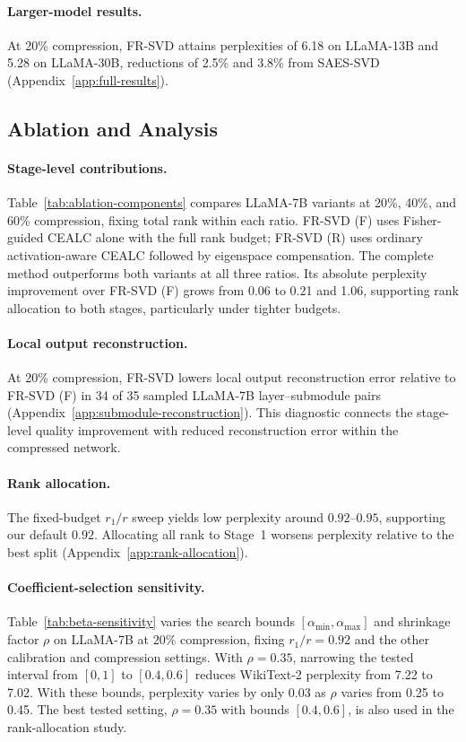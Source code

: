 \documentclass[11pt]{article}
\begin{document}
\paragraph{Larger-model results.}
At 20\% compression, FR-SVD attains perplexities of 6.18 on LLaMA-13B and 5.28 on LLaMA-30B, reductions of 2.5\% and 3.8\% from SAES-SVD (Appendix~\ref{app:full-results}).

\subsection{Ablation and Analysis}\label{sec:ablation}

\paragraph{Stage-level contributions.}

Table~\ref{tab:ablation-components} compares LLaMA-7B variants at 20\%, 40\%, and 60\% compression, fixing total rank within each ratio. FR-SVD (F) uses Fisher-guided CEALC alone with the full rank budget; FR-SVD (R) uses ordinary activation-aware CEALC followed by eigenspace compensation. The complete method outperforms both variants at all three ratios. Its absolute perplexity improvement over FR-SVD (F) grows from 0.06 to 0.21 and 1.06, supporting rank allocation to both stages, particularly under tighter budgets.



\paragraph{Local output reconstruction.}
At 20\% compression, FR-SVD lowers local output reconstruction error relative to FR-SVD (F) in 34 of 35 sampled LLaMA-7B layer--submodule pairs (Appendix~\ref{app:submodule-reconstruction}). This diagnostic connects the stage-level quality improvement with reduced reconstruction error within the compressed network.

\paragraph{Rank allocation.}
The fixed-budget $r_1/r$ sweep yields low perplexity around $0.92$--$0.95$, supporting our default $0.92$. Allocating all rank to Stage~1 worsens perplexity relative to the best split (Appendix~\ref{app:rank-allocation}).

\paragraph{Coefficient-selection sensitivity.}
Table~\ref{tab:beta-sensitivity} varies the search bounds $[\alpha_{\min},\alpha_{\max}]$ and shrinkage factor $\rho$ on LLaMA-7B at $20\%$ compression, fixing $r_1/r=0.92$ and the other calibration and compression settings. With $\rho=0.35$, narrowing the tested interval from $[0,1]$ to $[0.4,0.6]$ reduces WikiText-2 perplexity from 7.22 to 7.02. With these bounds, perplexity varies by only 0.03 as $\rho$ varies from 0.25 to 0.45. The best tested setting, $\rho=0.35$ with bounds $[0.4,0.6]$, is also used in the rank-allocation study.
\end{document}
